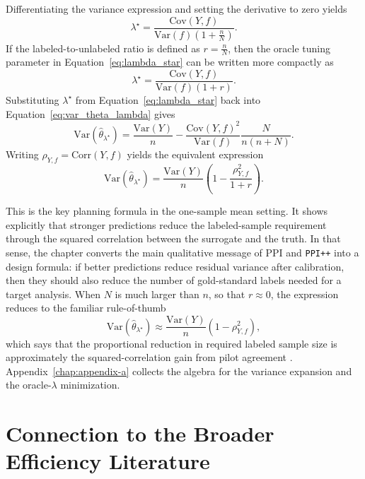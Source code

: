 Differentiating the variance expression and setting the derivative to zero yields
\begin{equation}
\lambda^\star
=
\frac{\mathrm{Cov}(Y,f)}
{\mathrm{Var}(f)\left(1+\frac{n}{N}\right)}.
\label{eq:lambda_star}
\end{equation}
If the labeled-to-unlabeled ratio is defined as \(r = \frac{n}{N}\), then the oracle tuning parameter in Equation~\eqref{eq:lambda_star} can be written more compactly as
\[
\lambda^\star
=
\frac{\mathrm{Cov}(Y,f)}
{\mathrm{Var}(f)(1+r)}.
\]
Substituting \(\lambda^\star\) from Equation~\eqref{eq:lambda_star} back into Equation~\eqref{eq:var_theta_lambda} gives
\begin{equation}
\mathrm{Var}(\widehat{\theta}_{\lambda^\star})
=
\frac{\mathrm{Var}(Y)}{n}
-
\frac{\mathrm{Cov}(Y,f)^2}{\mathrm{Var}(f)}
\frac{N}{n(n+N)}.
\label{eq:var_theta_lambda_star}
\end{equation}
Writing $\rho_{Y,f} = \mathrm{Corr}(Y,f)$ yields the equivalent expression
\begin{equation}
\mathrm{Var}(\widehat{\theta}_{\lambda^\star})
=
\frac{\mathrm{Var}(Y)}{n}
\left(
1-\frac{\rho_{Y,f}^2}{1+r}
\right).
\label{eq:var_theta_lambda_star_rho}
\end{equation}

This is the key planning formula in the one-sample mean setting. It shows explicitly that stronger predictions reduce the labeled-sample requirement through the squared correlation between the surrogate and the truth. In that sense, the chapter converts the main qualitative message of PPI and \texttt{PPI++} into a design formula: if better predictions reduce residual variance after calibration, then they should also reduce the number of gold-standard labels needed for a target analysis. When $N$ is much larger than $n$, so that $r \approx 0$, the expression reduces to the familiar rule-of-thumb
\[
\mathrm{Var}(\widehat{\theta}_{\lambda^\star})
\approx
\frac{\mathrm{Var}(Y)}{n}(1-\rho_{Y,f}^2),
\]
which says that the proportional reduction in required labeled sample size is approximately the squared-correlation gain from pilot agreement \parencite{ppi_power}. Appendix~\ref{chap:appendix-a} collects the algebra for the variance expansion and the oracle-$\lambda$ minimization.

\section{Connection to the Broader Efficiency Literature}

